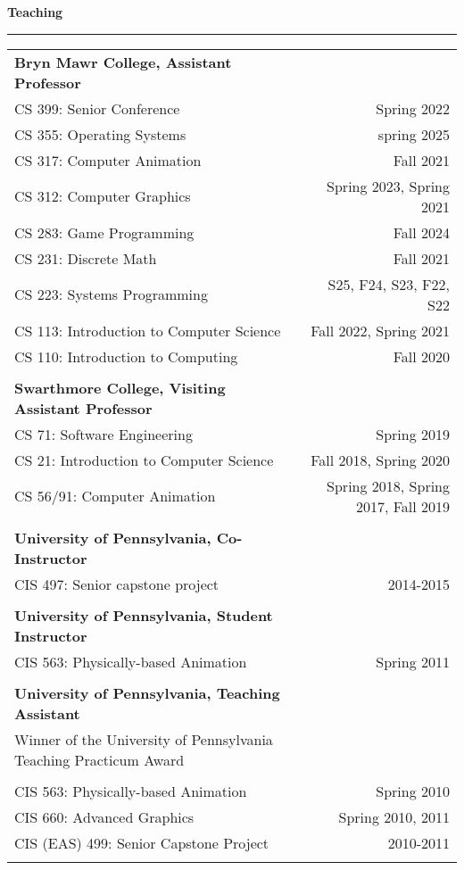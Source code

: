 \needspace{6em}
{\large {\bf Teaching}}
\vspace{0.1cm}
\hrule
\begin{tabular*}{7.1in}{@{}l@{\extracolsep\fill}r}

{\bf Bryn Mawr College, Assistant Professor} & \\
CS 399: Senior Conference & Spring 2022\\
CS 355: Operating Systems & spring 2025\\
CS 317: Computer Animation & Fall 2021\\
CS 312: Computer Graphics & Spring 2023, Spring 2021\\
CS 283: Game Programming & Fall 2024\\
CS 231: Discrete Math & Fall 2021\\
CS 223: Systems Programming & S25, F24, S23, F22, S22\\
CS 113: Introduction to Computer Science & Fall 2022, Spring 2021\\
CS 110: Introduction to Computing & Fall 2020\\
\phantom{yommomma} & \phantom{2002}\\

{\bf Swarthmore College, Visiting Assistant Professor} & \\
CS 71: Software Engineering & Spring 2019\\
CS 21: Introduction to Computer Science & Fall 2018, Spring 2020\\
CS 56/91: Computer Animation & Spring 2018, Spring 2017, Fall 2019\\
\phantom{yommomma} & \phantom{2002}\\

{\bf University of Pennsylvania, Co-Instructor} & \\
CIS 497: Senior capstone project & 2014-2015\\
\phantom{yommomma} & \phantom{2002}\\

{\bf University of Pennsylvania, Student Instructor} & \\
CIS 563: Physically-based Animation & Spring 2011\\
\phantom{yommomma} & \phantom{2002}\\
{\bf University of Pennsylvania, Teaching Assistant} & \\
Winner of the University of Pennsylvania Teaching Practicum Award & \\
\phantom{yommomma} & \phantom{2002}\\
CIS 563: Physically-based Animation & Spring 2010\\
CIS 660: Advanced Graphics & Spring 2010, 2011\\
CIS (EAS) 499: Senior Capstone Project  & 2010-2011\\
\phantom{yommomma} & \phantom{2002}\\
\end{tabular*}

\pagebreak

